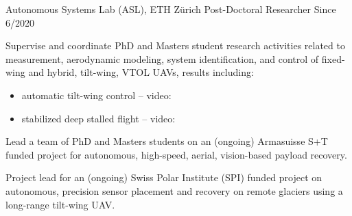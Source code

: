 \label{sec:exp}

\vspace{-8pt}
\begin{cventries}
%
\cvexpentry
  	{Autonomous Systems Lab (ASL), ETH Z\"{u}rich} %
  	{Post-Doctoral Researcher} %
    {} %
    {Since 6/2020} %
    {
      \begin{cvitems} %
      	\item Supervise and coordinate PhD and Masters student research activities related to measurement, aerodynamic modeling, system identification, and control of fixed-wing and hybrid, tilt-wing, VTOL UAVs, results including:
      	\begin{itemize}\setlength{\parskip}{0pt}
      		\item automatic tilt-wing control -- video: 
      		\item stabilized deep stalled flight -- video: 
    		\end{itemize}
      	\item Lead a team of PhD and Masters students on an (ongoing) Armasuisse S+T funded project for autonomous, high-speed, aerial, vision-based payload recovery.
      	\item Project lead for an (ongoing) Swiss Polar Institute (SPI) funded project on autonomous, precision sensor placement and recovery on remote glaciers using a long-range tilt-wing UAV. 
      \end{cvitems}
}
\end{cventries}
